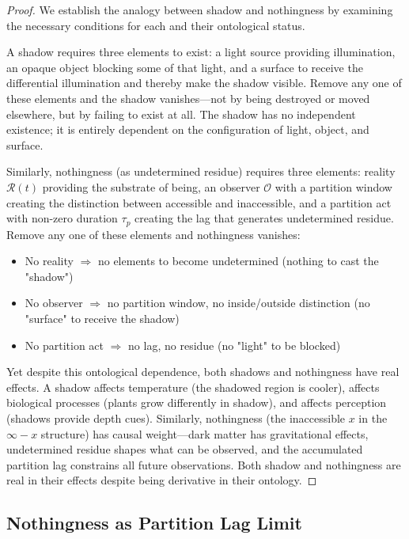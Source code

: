 \documentclass[12pt,a4paper]{article}
\theoremstyle{definition}
\theoremstyle{remark}
\begin{document}
\begin{proof}
We establish the analogy between shadow and nothingness by examining the necessary conditions for each and their ontological status.

A shadow requires three elements to exist: a light source providing illumination, an opaque object blocking some of that light, and a surface to receive the differential illumination and thereby make the shadow visible. Remove any one of these elements and the shadow vanishes—not by being destroyed or moved elsewhere, but by failing to exist at all. The shadow has no independent existence; it is entirely dependent on the configuration of light, object, and surface.

Similarly, nothingness (as undetermined residue) requires three elements: reality $\mathcal{R}(t)$ providing the substrate of being, an observer $\mathcal{O}$ with a partition window creating the distinction between accessible and inaccessible, and a partition act with non-zero duration $\tau_p$ creating the lag that generates undetermined residue. Remove any one of these elements and nothingness vanishes:
\begin{itemize}
    \item No reality $\Rightarrow$ no elements to become undetermined (nothing to cast the "shadow")
    \item No observer $\Rightarrow$ no partition window, no inside/outside distinction (no "surface" to receive the shadow)
    \item No partition act $\Rightarrow$ no lag, no residue (no "light" to be blocked)
\end{itemize}

Yet despite this ontological dependence, both shadows and nothingness have real effects. A shadow affects temperature (the shadowed region is cooler), affects biological processes (plants grow differently in shadow), and affects perception (shadows provide depth cues). Similarly, nothingness (the inaccessible $x$ in the $\infty - x$ structure) has causal weight—dark matter has gravitational effects, undetermined residue shapes what can be observed, and the accumulated partition lag constrains all future observations. Both shadow and nothingness are real in their effects despite being derivative in their ontology.
\end{proof}

\subsection{Nothingness as Partition Lag Limit}
\end{document}
